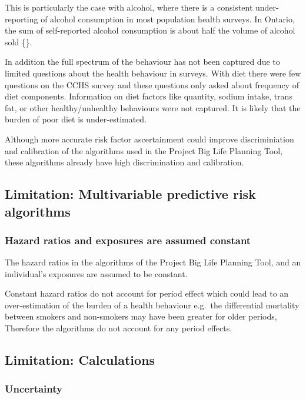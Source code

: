 \documentclass[]{book}
\begin{document}
This is particularly the case with alcohol, where there is a consistent
under-reporting of alcohol consumption in most population health
surveys. In Ontario, the sum of self-reported alcohol consumption is
about half the volume of alcohol sold \{\citet{ONalcohol}\}.

In addition the full spectrum of the behaviour has not been captured due
to limited questions about the health behaviour in surveys. With diet
there were few questions on the CCHS survey and these questions only
asked about frequency of diet components. Information on diet factors
like quantity, sodium intake, trans fat, or other healthy/unhealthy
behaviours were not captured. It is likely that the burden of poor diet
is under-estimated.

Although more accurate risk factor ascertainment could improve
discriminiation and calibration of the algorithms used in the Project
Big Life Planning Tool, these algorithms already have high
discrimination and calibration.

\subsection{Limitation: Multivariable predictive risk
algorithms}\label{limitation-multivariable-predictive-risk-algorithms}

\subsubsection{Hazard ratios and exposures are assumed
constant}\label{hazard-ratios-and-exposures-are-assumed-constant}

The hazard ratios in the algorithms of the Project Big Life Planning
Tool, and an individual's exposures are assumed to be constant.

Constant hazard ratios do not account for period effect which could lead
to an over-estimation of the burden of a health behaviour e.g.~the
differential mortality between smokers and non-smokers may have been
greater for older periods, Therefore the algorithms do not account for
any period effects.

\subsection{Limitation: Calculations}\label{limitation-calculations}

\subsubsection{Uncertainty}\label{uncertainty}
\end{document}
